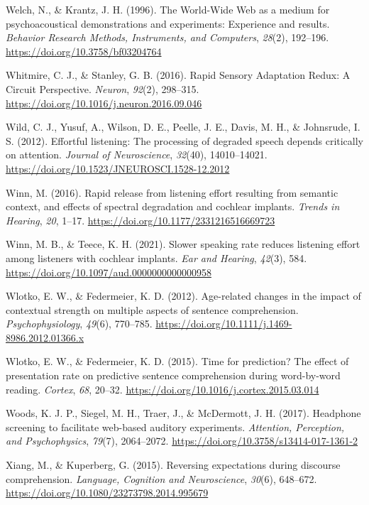\documentclass[a4paper, nobind]{templates/ociamthesis}
\newlength{\cslhangindent}
\newenvironment{CSLReferences}[2] %
 {%
  \setlength{\parindent}{0pt}
  \ifodd #1
  \let\oldpar\par
  \def\par{\hangindent=\cslhangindent\oldpar}
  \fi
  \setlength{\parskip}{1mm}
  \setlength{\baselineskip}{6mm}
 }%
 {}
\begin{document}
\begin{CSLReferences}{1}{0}
\leavevmode{}%
Welch, N., \& Krantz, J. H. (1996). {The World-Wide Web as a medium for psychoacoustical demonstrations and experiments: Experience and results}. \emph{Behavior Research Methods, Instruments, and Computers}, \emph{28}(2), 192--196. \url{https://doi.org/10.3758/bf03204764}

\leavevmode{}%
Whitmire, C. J., \& Stanley, G. B. (2016). {Rapid Sensory Adaptation Redux: A Circuit Perspective}. \emph{Neuron}, \emph{92}(2), 298--315. \url{https://doi.org/10.1016/j.neuron.2016.09.046}

\leavevmode{}%
Wild, C. J., Yusuf, A., Wilson, D. E., Peelle, J. E., Davis, M. H., \& Johnsrude, I. S. (2012). {Effortful listening: The processing of degraded speech depends critically on attention}. \emph{Journal of Neuroscience}, \emph{32}(40), 14010--14021. \url{https://doi.org/10.1523/JNEUROSCI.1528-12.2012}

\leavevmode{}%
Winn, M. (2016). Rapid release from listening effort resulting from semantic context, and effects of spectral degradation and cochlear implants. \emph{Trends in Hearing}, \emph{20}, 1--17. \url{https://doi.org/10.1177/2331216516669723}

\leavevmode{}%
Winn, M. B., \& Teece, K. H. (2021). {Slower speaking rate reduces listening effort among listeners with cochlear implants}. \emph{Ear and Hearing}, \emph{42}(3), 584. \url{https://doi.org/10.1097/aud.0000000000000958}

\leavevmode{}%
Wlotko, E. W., \& Federmeier, K. D. (2012). Age-related changes in the impact of contextual strength on multiple aspects of sentence comprehension. \emph{Psychophysiology}, \emph{49}(6), 770--785. \url{https://doi.org/10.1111/j.1469-8986.2012.01366.x}

\leavevmode{}%
Wlotko, E. W., \& Federmeier, K. D. (2015). {Time for prediction? The effect of presentation rate on predictive sentence comprehension during word-by-word reading}. \emph{Cortex}, \emph{68}, 20--32. \url{https://doi.org/10.1016/j.cortex.2015.03.014}

\leavevmode{}%
Woods, K. J. P., Siegel, M. H., Traer, J., \& McDermott, J. H. (2017). {Headphone screening to facilitate web-based auditory experiments}. \emph{Attention, Perception, and Psychophysics}, \emph{79}(7), 2064--2072. \url{https://doi.org/10.3758/s13414-017-1361-2}

\leavevmode{}%
Xiang, M., \& Kuperberg, G. (2015). {Reversing expectations during discourse comprehension}. \emph{Language, Cognition and Neuroscience}, \emph{30}(6), 648--672. \url{https://doi.org/10.1080/23273798.2014.995679}

\end{CSLReferences}

\end{document}
